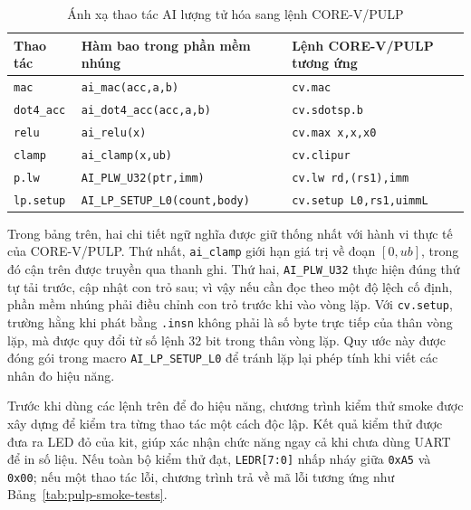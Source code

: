 \documentclass[../DoAn.tex]{subfiles}
\begin{document}
\begin{table}[H]
    \centering
    \footnotesize
    \setlength{\tabcolsep}{5pt}
    \renewcommand{\arraystretch}{1.24}
    \begin{tabular}{|>{\raggedright\arraybackslash}p{1.95cm}|>{\raggedright\arraybackslash}p{6.25cm}|>{\raggedright\arraybackslash}p{4.35cm}|}
        \hline
        \textbf{Thao tác} & \textbf{Hàm bao trong phần mềm nhúng} & \textbf{Lệnh CORE-V/PULP tương ứng} \\
        \hline
        \texttt{mac} & \texttt{ai\_mac(acc,a,b)} & \texttt{cv.mac} \\
        \hline
        \texttt{dot4\_acc} & \texttt{ai\_dot4\_acc(acc,a,b)} & \texttt{cv.sdotsp.b} \\
        \hline
        \texttt{relu} & \texttt{ai\_relu(x)} & \texttt{cv.max x,x,x0} \\
        \hline
        \texttt{clamp} & \texttt{ai\_clamp(x,ub)} & \texttt{cv.clipur} \\
        \hline
        \texttt{p.lw} & \texttt{AI\_PLW\_U32(ptr,imm)} & \texttt{cv.lw rd,(rs1),imm} \\
        \hline
        \texttt{lp.setup} & \texttt{AI\_LP\_SETUP\_L0(count,body)} & \texttt{cv.setup L0,rs1,uimmL} \\
        \hline
    \end{tabular}
    \caption{Ánh xạ thao tác AI lượng tử hóa sang lệnh CORE-V/PULP}
    \label{tab:board-ai-op-mapping}
\end{table}

Trong bảng trên, hai chi tiết ngữ nghĩa được giữ thống nhất với hành vi thực tế của CORE-V/PULP. Thứ nhất, \texttt{ai\_clamp} giới hạn giá trị về đoạn \([0,ub]\), trong đó cận trên được truyền qua thanh ghi. Thứ hai, \texttt{AI\_PLW\_U32} thực hiện đúng thứ tự tải trước, cập nhật con trỏ sau; vì vậy nếu cần đọc theo một độ lệch cố định, phần mềm nhúng phải điều chỉnh con trỏ trước khi vào vòng lặp. Với \texttt{cv.setup}, trường hằng khi phát bằng \texttt{.insn} không phải là số byte trực tiếp của thân vòng lặp, mà được quy đổi từ số lệnh 32 bit trong thân vòng lặp. Quy ước này được đóng gói trong macro \texttt{AI\_LP\_SETUP\_L0} để tránh lặp lại phép tính khi viết các nhân đo hiệu năng.

Trước khi dùng các lệnh trên để đo hiệu năng, chương trình kiểm thử smoke được xây dựng để kiểm tra từng thao tác một cách độc lập. Kết quả kiểm thử được đưa ra LED đỏ của kit, giúp xác nhận chức năng ngay cả khi chưa dùng UART để in số liệu. Nếu toàn bộ kiểm thử đạt, \texttt{LEDR[7:0]} nhấp nháy giữa \texttt{0xA5} và \texttt{0x00}; nếu một thao tác lỗi, chương trình trả về mã lỗi tương ứng như Bảng~\ref{tab:pulp-smoke-tests}.
\end{document}
